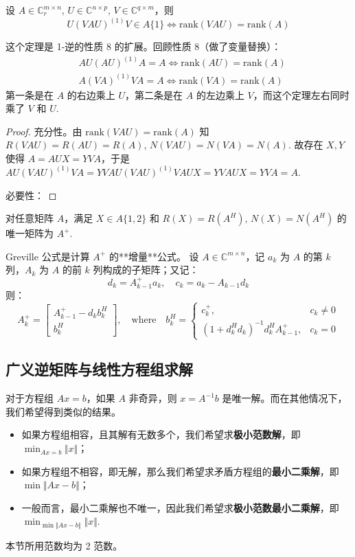 \begin{theorem}
设 $A\in\mathbb C_r^{m\times n},\,U\in\mathbb C^{n\times p},\,V\in\mathbb C^{q\times m}$，则
\[
    U(VAU)^{(1)}V\in A\{1\}\iff \text{rank}(VAU)=\text{rank}(A)
\]
\end{theorem}
\begin{remark}
这个定理是 1-逆的性质 8 的扩展。回顾性质 8（做了变量替换）：
\begin{align*}
    &AU(AU)^{(1)}A=A\iff\text{rank}(AU)=\text{rank}(A)\\
    &A(VA)^{(1)}VA=A\iff\text{rank}(VA)=\text{rank}(A)
\end{align*}
第一条是在 $A$ 的右边乘上 $U$，第二条是在 $A$ 的左边乘上 $V$，而这个定理左右同时乘了 $V$ 和 $U$.
\end{remark}
\begin{proof}
充分性。由 $\text{rank}(VAU)=\text{rank}(A)$ 知 $R(VAU)=R(AU)=R(A),\,N(VAU)=N(VA)=N(A)$. 故存在 $X,Y$ 使得 $A=AUX=YVA$，于是 $AU(VAU)^{(1)}VA=YVAU(VAU)^{(1)}VAUX=YVAUX=YVA=A$.

必要性：{\color{red}{？？？TODO}}
\end{proof}

\begin{theorem}
对任意矩阵 $A$，满足 $X\in A\{1,2\}$ 和 $R(X)=R(A^H),\,N(X)=N(A^H)$ 的唯一矩阵为 $A^+$.
\end{theorem}

\begin{theorem}
Greville 公式是计算 $A^+$ 的**增量**公式。
设 $A\in\mathbb C^{m\times n}$，记 $a_k$ 为 $A$ 的第 $k$ 列，$A_k$ 为 $A$ 的前 $k$ 列构成的子矩阵；又记：
\[
    d_k=A^+_{k-1}a_k,\quad c_k=a_k-A_{k-1}d_k
\]
则：
\[
    A^+_k=\begin{bmatrix}A^+_{k-1}-d_kb_k^H\\b_k^H\end{bmatrix},\quad\text{where}\quad b_k^H=\begin{cases}c_k^+,&c_k\neq 0\\(1+d_k^Hd_k)^{-1}d_k^HA^+_{k-1},&c_k=0\end{cases}
\]
\end{theorem}


\subsection{广义逆矩阵与线性方程组求解}

对于方程组 $Ax=b$，如果 $A$ 非奇异，则 $x=A^{-1}b$ 是唯一解。而在其他情况下，我们希望得到类似的结果。
\begin{itemize}
    \item 如果方程组相容，且其解有无数多个，我们希望求\textbf{极小范数解}，即 $\min_{Ax=b}\Vert x\Vert$；
    \item 如果方程组不相容，即无解，那么我们希望求矛盾方程组的\textbf{最小二乘解}，即 $\min \Vert Ax-b\Vert$；
    \item 一般而言，最小二乘解也不唯一，因此我们希望求\textbf{极小范数最小二乘解}，即 $\min_{\min\Vert Ax-b\Vert}\Vert x\Vert$.
\end{itemize}
\begin{com}
本节所用范数均为 2 范数。
\end{com}

